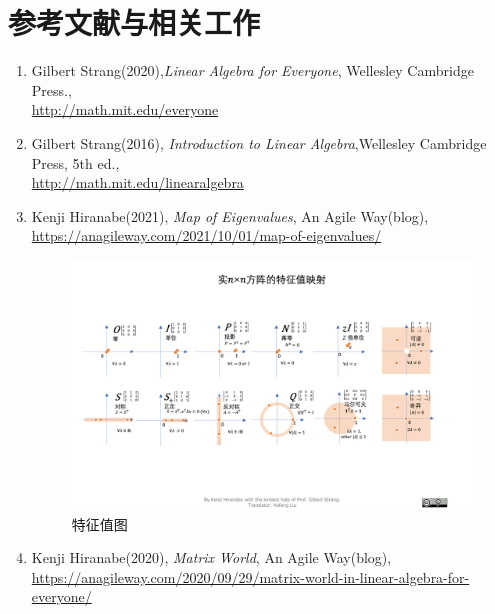 \documentclass[letterpaper]{article}
\begin{document}
\section*{参考文献与相关工作}
\begin{enumerate}
  \item 
  Gilbert Strang(2020),\emph{Linear Algebra for Everyone}, Wellesley Cambridge Press.,\\
  \href{http://math.mit.edu/everyone}{http://math.mit.edu/everyone}
  \item
  Gilbert Strang(2016), \emph{Introduction to Linear Algebra},Wellesley Cambridge Press, 5th ed.,\\
  \href{http://math.mit.edu/linearalgebra}{http://math.mit.edu/linearalgebra}
  \item Kenji Hiranabe(2021), \emph{Map of Eigenvalues}, An Agile Way(blog),\\
  \href{https://anagileway.com/2021/10/01/map-of-eigenvalues/}{https://anagileway.com/2021/10/01/map-of-eigenvalues/}\\
  \begin{figure}[H]
    \centering
    \includegraphics[keepaspectratio, width=\linewidth]{MapofEigenvalues-zh-CN.png}
    \caption{特征值图}
  \end{figure}
  \item Kenji Hiranabe(2020), \emph{Matrix World}, An Agile Way(blog),\\
  \href{https://anagileway.com/2020/09/29/matrix-world-in-linear-algebra-for-everyone/}{https://anagileway.com/2020/09/29/matrix-world-in-linear-algebra-for-everyone/}
  \begin{figure}[H]
    \centering

\end{figure}
\end{enumerate}
\end{document}
